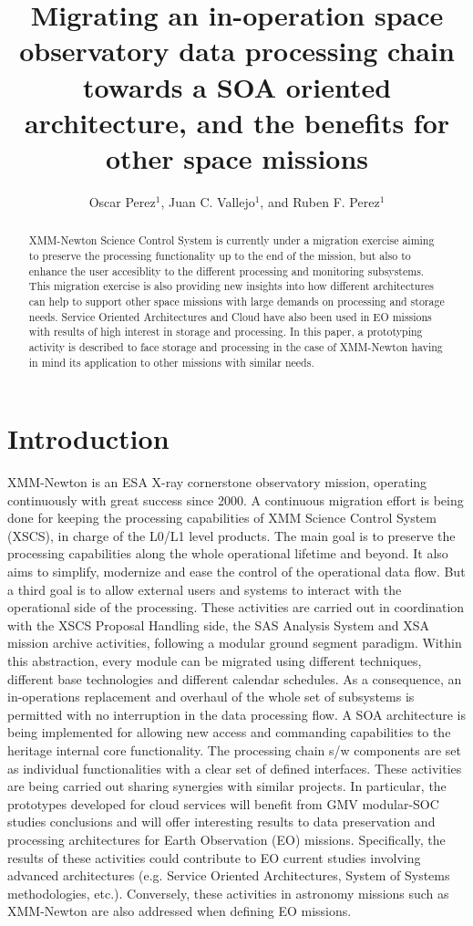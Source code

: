 \documentclass[11pt,twoside]{article}
\begin{document}
\title{Migrating an in-operation space observatory data processing chain towards a SOA oriented architecture, and the benefits for other space missions}
\author{Oscar Perez$^1$, Juan C. Vallejo$^1$, and Ruben F. Perez$^1$
}

\begin{abstract}
XMM-Newton Science Control System is currently under a migration exercise  aiming 
to preserve the processing functionality up to the end of the mission, but also
to enhance the user accesiblity to the different processing and monitoring subsystems.
This migration exercise is also providing new insights into
how different architectures can help to support other space missions
with large demands on processing and storage needs.
Service Oriented Architectures and Cloud have also been used in EO missions 
with results of high interest in storage and processing. In this paper, 
a prototyping activity is described to face storage and processing in the case of XMM-Newton having in mind its application to other missions with similar needs.    
\end{abstract}

\section{Introduction}
XMM-Newton is an ESA X-ray cornerstone observatory mission, operating continuously with great success since 2000. A continuous migration effort is being done for keeping the processing capabilities of XMM Science Control System (XSCS), in charge of the L0/L1 level products. The main goal is to preserve the processing capabilities along the whole operational lifetime and beyond. It also aims to simplify, modernize and ease the control of the operational data flow. But a third goal is to allow external users and systems to interact with the operational side of the processing.
These activities are carried out in coordination with the XSCS Proposal Handling side, the SAS Analysis System and XSA mission archive activities, following a modular ground segment paradigm. Within this abstraction, every module can be migrated using different techniques, different base technologies and different calendar schedules. As a consequence, an in-operations replacement and overhaul of the whole set of subsystems is permitted with no interruption in the data processing flow. 
A SOA architecture is being implemented for allowing new access and commanding capabilities to the heritage internal core functionality. The processing chain s/w components are set as individual functionalities with a clear set of defined interfaces.
These activities are being carried out sharing synergies with similar projects. In particular, the prototypes developed for cloud services will benefit from GMV modular-SOC studies conclusions and will offer interesting results to data preservation and processing architectures for Earth Observation (EO) missions. Specifically, the results of these activities could contribute to EO  current studies involving advanced architectures (e.g. Service Oriented Architectures, System of Systems methodologies, etc.). Conversely, these activities in astronomy missions such as XMM-Newton are also addressed when defining EO missions.
\end{document}

